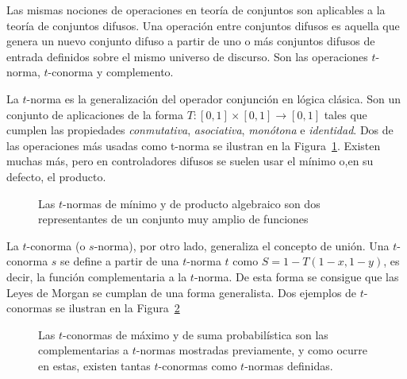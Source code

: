 Las mismas nociones de operaciones en teoría de conjuntos son aplicables a la teoría de conjuntos difusos. Una operación entre conjuntos difusos es aquella que genera un nuevo conjunto difuso a partir de uno o más conjuntos difusos de entrada definidos sobre el mismo universo de discurso. Son las operaciones $t$-norma, $t$-conorma y complemento.

La $t$-norma es la generalización del operador conjunción en lógica clásica. Son un conjunto de aplicaciones de la forma $T: [0, 1] \times [0, 1] \rightarrow [0, 1]$ tales que cumplen las propiedades \textit{conmutativa}, \textit{asociativa}, \textit{monótona} e \textit{identidad}. Dos de las operaciones más usadas como t-norma se ilustran en la Figura~\ref{fig:t-norms}. Existen muchas más, pero en controladores difusos se suelen usar el mínimo o,en su defecto, el producto.

\begin{figure}[t]
	\centering
	\qquad
	\caption[$t$-normas del mínimo y del producto algebraico.]{Las $t$-normas de mínimo y de producto algebraico son dos representantes de un conjunto muy amplio de funciones}
	\label{fig:t-norms}
\end{figure}

La $t$-conorma (o $s$-norma), por otro lado, generaliza el concepto de unión. Una $t$-conorma $s$ se define a partir de una $t$-norma $t$ como $S = 1 - T(1-x, 1-y)$, es decir, la función complementaria a la $t$-norma. De esta forma se consigue que las Leyes de Morgan se cumplan de una forma generalista. Dos ejemplos de $t$-conormas se ilustran en la Figura~\ref{fig:t-conorms}

\begin{figure}[!b]
	\centering
	\qquad
	\caption[$t$-conormas del máximo y de la suma probabilística]{Las $t$-conormas de máximo y de suma probabilística son las complementarias a $t$-normas mostradas previamente, y como ocurre en estas, existen tantas $t$-conormas como $t$-normas definidas.}
	\label{fig:t-conorms}
\end{figure}

